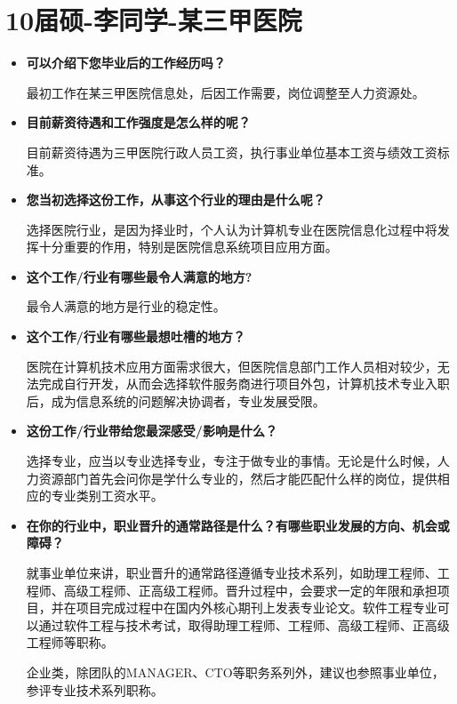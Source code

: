 \newpage
\section{10届硕-李同学-某三甲医院}
\begin{itemize}

\setlength{\parindent}{2em} 
    \item \textbf{可以介绍下您毕业后的工作经历吗？}

最初工作在某三甲医院信息处，后因工作需要，岗位调整至人力资源处。

    \item \textbf{目前薪资待遇和工作强度是怎么样的呢？}

目前薪资待遇为三甲医院行政人员工资，执行事业单位基本工资与绩效工资标准。


    \item \textbf{您当初选择这份工作，从事这个行业的理由是什么呢？}

选择医院行业，是因为择业时，个人认为计算机专业在医院信息化过程中将发挥十分重要的作用，特别是医院信息系统项目应用方面。

  
    \item \textbf{这个工作/行业有哪些最令人满意的地方?}

最令人满意的地方是行业的稳定性。


    \item \textbf{这个工作/行业有哪些最想吐槽的地方？}

医院在计算机技术应用方面需求很大，但医院信息部门工作人员相对较少，无法完成自行开发，从而会选择软件服务商进行项目外包，计算机技术专业入职后，成为信息系统的问题解决协调者，专业发展受限。

    \item \textbf{这份工作/行业带给您最深感受/影响是什么？}

选择专业，应当以专业选择专业，专注于做专业的事情。无论是什么时候，人力资源部门首先会问你是学什么专业的，然后才能匹配什么样的岗位，提供相应的专业类别工资水平。

    \item \textbf{在你的行业中，职业晋升的通常路径是什么？有哪些职业发展的方向、机会或障碍？}

就事业单位来讲，职业晋升的通常路径遵循专业技术系列，如助理工程师、工程师、高级工程师、正高级工程师。晋升过程中，会要求一定的年限和承担项目，并在项目完成过程中在国内外核心期刊上发表专业论文。软件工程专业可以通过软件工程与技术考试，取得助理工程师、工程师、高级工程师、正高级工程师等职称。

企业类，除团队的MANAGER、CTO等职务系列外，建议也参照事业单位，参评专业技术系列职称。


\end{itemize}
